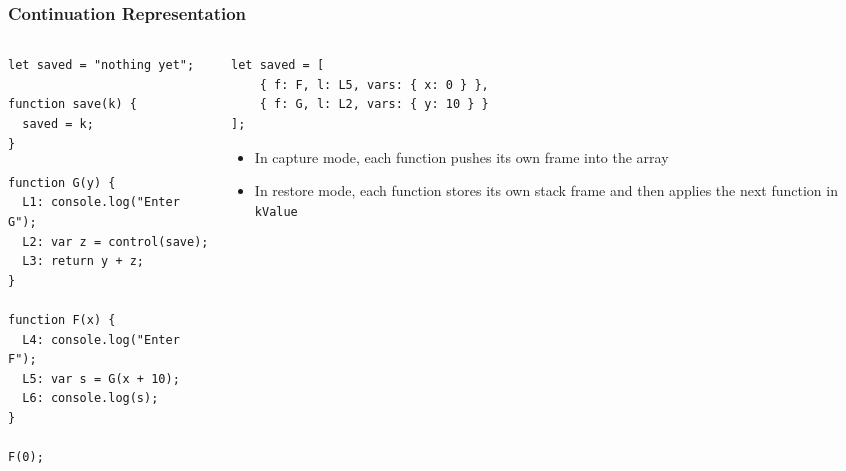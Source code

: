 \documentclass[8pt,pdf,handout]{beamer}
\begin{document}
\begin{frame}[fragile]

\frametitle{Continuation Representation}

\begin{columns}

\begin{column}{0.4\textwidth}
\begin{lstlisting}
let saved = "nothing yet";

function save(k) {
  saved = k;
}

function G(y) {
  L1: console.log("Enter G");
  L2: var z = control(save);
  L3: return y + z;
}

function F(x) {
  L4: console.log("Enter F");
  L5: var s = G(x + 10);
  L6: console.log(s);
}

F(0);
\end{lstlisting}

\end{column}

\begin{column}{0.55\textwidth}

\begin{lstlisting}
let saved = [
    { f: F, l: L5, vars: { x: 0 } },
    { f: G, l: L2, vars: { y: 10 } }
];
\end{lstlisting}

\begin{itemize}

    \item In capture mode, each function pushes its own frame into the array

    \item In restore mode, each function stores its own stack frame and then
    applies the next function in \lstinline|kValue|

\end{itemize}

\end{column}

\end{columns}

\end{frame}
\end{document}
